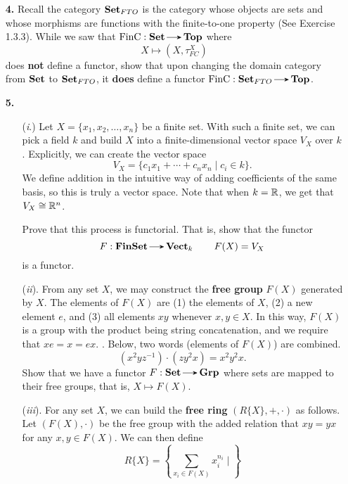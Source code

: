 \begin{itemize}
        \item[\textbf{4.}] Recall the category $\operatorname{\mathbf{Set}}_{FTO}$ 
        is the category whose objects are sets and whose morphisms are functions 
        with the finite-to-one property (See Exercise 1.3.3). While we saw 
        that $\text{FinC}: \Set \to \top$ where 
        \[
                X \mapsto (X, \tau^X_{FC})
        \]
        does \textbf{not} define a functor, show that upon changing the domain  
        category from $\operatorname{\mathbf{Set}}$ to $\operatorname{\mathbf{Set}}_{FTO}$, it \textbf{does} 
        define a functor $\text{FinC}: \Set_{FTO} \to \top$.
        \vspace{0.2cm}

        \item[\textbf{5.}]
        \begin{itemize}
            \item[(\emph{i}.)]
            Let $X = \{x_1, x_2, \dots, x_n\}$ be a finite set. With such 
            a finite set, we can
            pick a field $k$ and build $X$ into a finite-dimensional 
            vector space $V_X$ over $k$. Explicitly, we can create the vector  
            space
            \[
                V_X= \{c_1x_1 + \cdots + c_nx_n \mid c_i \in k\}.
            \]
            We define addition in the intuitive way of adding coefficients of the 
            same basis, so this is truly a vector space. Note that when $k = \mathbb{R}$, 
            we get that $V_X \cong \mathbb{R}^n$. 

            Prove that this process is functorial. That is, show that the functor 
            \[
                F: \finset \to \vect_k \qquad F(X) = V_X
            \]
            is a functor. 

            \item[(\emph{ii}).]
            From any set $X$, we may construct the \textbf{free group} $F(X)$ generated 
            by $X$. The elements of $F(X)$ are (1) the elements of $X$, (2) a new 
            element $e$, and (3) all elements $xy$ whenever $x, y \in X$. 
            In this way, $F(X)$ is a group with the product being string concatenation, 
            and we require that $xe = x = ex$. 
            . Below, two words (elements of $F(X)$) are combined.        
            \[
                (x^2yz^{-1}) \cdot (zy^2x) = x^2y^2x.
            \]
            Show that we have a functor $F: \Set \to \grp$ where 
            sets are mapped to their free groups, that is, $X \mapsto F(X)$.  

            \item[(\emph{iii}).]
            For any set $X$, we can build the \textbf{free ring} $(R\{X\}, +, \cdot)$ 
            as follows. Let $(F(X), \cdot)$ be the free group with the added relation that 
            $xy = yx$ for any $x, y  \in F(X)$. We can then define
            \[
                R\{X\} = \left\{ \sum_{x_i \in F(X)} x_i^{n_i} \mid \right\}
            \]


\end{itemize}
\end{itemize}
